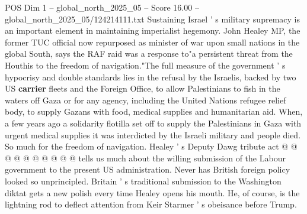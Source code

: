 \begin{textsample}{POS Dim 1 – global\_north\_2025\_05 – Score 16.00 – global\_north\_2025\_05/124214111.txt}
Sustaining Israel ' s military supremacy is an important element in maintaining imperialist hegemony.
John Healey MP, the former TUC official now repurposed as minister of war upon small nations in the global South, says the RAF raid was a response to"a persistent threat from the Houthis to the freedom of navigation."The full measure of the government ' s hypocrisy and double standards lies in the refusal by the Israelis, backed by two US \textbf{carrier} fleets and the Foreign Office, to allow Palestinians to fish in the waters off Gaza or for any agency, including the United Nations refugee relief body, to supply Gazans with food, medical supplies and humanitarian aid.
When, a few years ago a solidarity flotilla set off to supply the Palestinians in Gaza with urgent medical supplies it was interdicted by the Israeli military and people died.
So much for the freedom of navigation.
Healey ' s Deputy Dawg tribute act @ @ @ @ @ @ @ @ @ @ tells us much about the willing submission of the Labour government to the present US administration.
Never has British foreign policy looked so unprincipled.
Britain ' s traditional submission to the Washington diktat gets a new polish every time Healey opens his mouth.
He, of course, is the lightning rod to deflect attention from Keir Starmer ' s obeisance before Trump.

\end{textsample}
